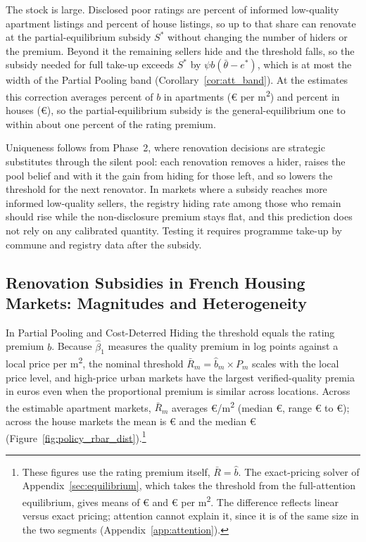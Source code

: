 \documentclass[10pt,letterpaper]{bp-template-concise}
\begin{document}
The stock is large. Disclosed poor ratings are \attGeDisclosedShareApt{} percent of informed low-quality apartment listings and \attGeDisclosedShareHouse{} percent of house listings, so up to that share can renovate at the partial-equilibrium subsidy $S^*$ without changing the number of hiders or the premium. Beyond it the remaining sellers hide and the threshold falls, so the subsidy needed for full take-up exceeds $S^*$ by $\psi b(\bar\theta-e^*)$, which is at most the width of the Partial Pooling band (Corollary~\ref{cor:att_band}). At the estimates this correction averages \attGeCorrPctBApt{} percent of $b$ in apartments (\euro{}\attGeCorrEurApt{} per m\textsuperscript{2}) and \attGeCorrPctBHouse{} percent in houses (\euro{}\attGeCorrEurHouse{}), so the partial-equilibrium subsidy is the general-equilibrium one to within about one percent of the rating premium. 

Uniqueness follows from Phase~2, where renovation decisions are strategic substitutes through the silent pool: each renovation removes a hider, raises the pool belief and with it the gain from hiding for those left, and so lowers the threshold for the next renovator. In markets where a subsidy reaches more informed low-quality sellers, the registry hiding rate among those who remain should rise while the non-disclosure premium stays flat, and this prediction does not rely on any calibrated quantity. Testing it requires programme take-up by commune and registry data after the subsidy.

\subsection{Renovation Subsidies in French Housing Markets: Magnitudes and Heterogeneity}
\label{sec:policy_empirical}

In Partial Pooling and Cost-Deterred Hiding the threshold equals the rating premium $b$. Because $\hat\beta_1$ measures the quality premium in log points against a local price per m\textsuperscript{2}, the nominal threshold $\bar R_m=\hat b_m\times P_m$ scales with the local price level, and high-price urban markets have the largest verified-quality premia in euros even when the proportional premium is similar across locations. Across the \attNMarketsApt{} estimable apartment markets, $\bar R_m$ averages \euro{}\attScBaseRbarApt{}/m\textsuperscript{2} (median \euro{}\attBaseRbarMedApt{}, range \euro{}\attBaseRbarMinApt{} to \euro{}\attBaseRbarMaxApt{}); across the \attNMarketsHouse{} house markets the mean is \euro{}\attScBaseRbarHouse{} and the median \euro{}\attBaseRbarMedHouse{} (Figure~\ref{fig:policy_rbar_dist}).\footnote{These figures use the rating premium itself, $\bar R=\hat b$. The exact-pricing solver of Appendix~\ref{sec:equilibrium}, which takes the threshold from the full-attention equilibrium, gives means of \euro{}\attRbarCoreEurTwoFiftyApt{} and \euro{}\attRbarCoreEurTwoFiftyHouse{} per m\textsuperscript{2}. The difference reflects linear versus exact pricing; attention cannot explain it, since it is of the same size in the two segments (Appendix~\ref{app:attention}).}
\end{document}
